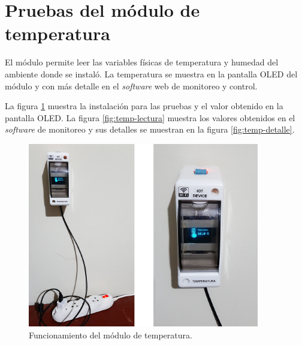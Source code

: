 


\section{Pruebas del módulo de temperatura}

El módulo permite leer las variables físicas de temperatura y humedad del ambiente donde se instaló. La temperatura se muestra en la pantalla OLED del módulo y con más detalle en el \emph{software} web de monitoreo y control.

La figura \ref{fig:test-temp} muestra la instalación para las pruebas y el valor obtenido en la pantalla OLED. La figura \ref{fig:temp-lectura} muestra los valores obtenidos en el \emph{software} de monitoreo y sus detalles se muestran en la figura \ref{fig:temp-detalle}.

\begin{figure}[htpb]
\centering 
\includegraphics[width=0.9\textwidth]{./Figures/test/temp/test-temp.png}
\caption{Funcionamiento del módulo de temperatura.}
\label{fig:test-temp}
\end{figure}

